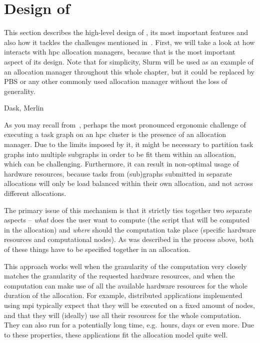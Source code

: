 
\section{Design of \hyperqueue{}}
\label{sec:hq-design}
This section describes the high-level design of \hyperqueue{}, its most important features
and also how it tackles the challenges mentioned in~. First, we will take a
look at how \hyperqueue{} interacts with \gls{hpc} allocation managers,
because that is the most important aspect of its design. Note that for simplicity, Slurm will be
used as an example of an allocation manager throughout this whole chapter, but it could be replaced
by PBS or any other commonly used allocation manager without the loss of generality.

Dask, Merlin

As you may recall from~, perhaps the most pronounced ergonomic challenge of
executing a task graph on an \gls{hpc} cluster is the presence of an allocation
manager. Due to the limits imposed by it, it might be necessary to partition task graphs into
multiple subgraphs in order to be fit them within an allocation, which can be challenging.
Furthermore, it can result in non-optimal usage of hardware resources, because tasks from
(sub)graphs submitted in separate allocations will only be load balanced within their own
allocation, and not across different allocations.

The primary issue of this mechanism is that it strictly ties together two separate aspects --
\emph{what} does the user want to compute (the script that will be computed in the
allocation) and \emph{where} should the computation take place (specific hardware
resources and computational nodes). As was described in the process above, both of these things
have to be specified together in an allocation.


This approach works well when the granularity of the computation very closely matches the
granularity of the requested hardware resources, and when the computation can make use of all the
available hardware resources for the whole duration of the allocation. For example, distributed
applications implemented using \gls{mpi} typically expect that they will be executed
on a fixed amount of nodes, and that they will (ideally) use all their resources for the whole
computation. They can also run for a potentially long time, e.g.\ hours, days or even more. Due to
these properties, these applications fit the allocation model quite well.

